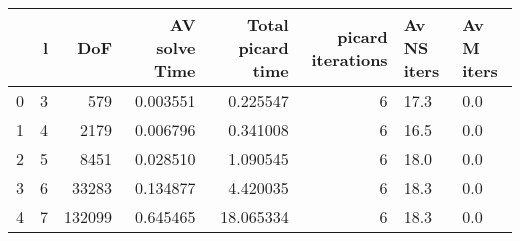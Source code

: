 \begin{tabular}{lrrrrrll}
\toprule
{} &  l &     DoF &  AV solve Time &  Total picard time &  picard iterations & Av NS iters & Av M iters \\
\midrule
0 &  3 &     579 &       0.003551 &           0.225547 &                  6 &        17.3 &        0.0 \\
1 &  4 &    2179 &       0.006796 &           0.341008 &                  6 &        16.5 &        0.0 \\
2 &  5 &    8451 &       0.028510 &           1.090545 &                  6 &        18.0 &        0.0 \\
3 &  6 &   33283 &       0.134877 &           4.420035 &                  6 &        18.3 &        0.0 \\
4 &  7 &  132099 &       0.645465 &          18.065334 &                  6 &        18.3 &        0.0 \\
\bottomrule
\end{tabular}
